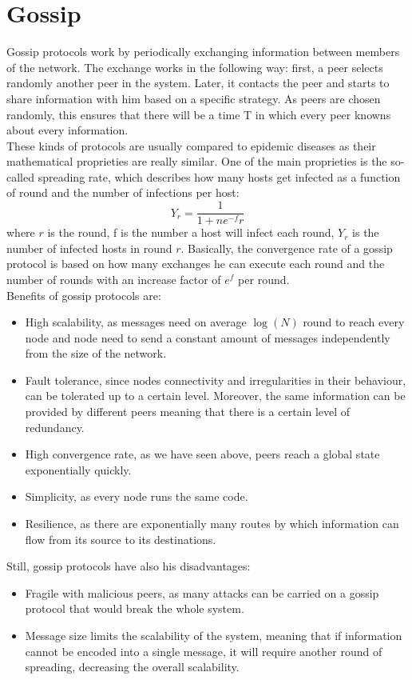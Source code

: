 \documentclass[mscthesis]{usiinfthesis}
\begin{document}
\section{Gossip}
Gossip protocols work by periodically exchanging information between members of the network. The exchange works in the following way: first, a peer selects randomly another peer in the system. Later, it contacts the peer and starts to share information with him based on a specific strategy. As peers are chosen randomly, this ensures that there will be a time T in which every peer knowns about every information. \\
These kinds of protocols are usually compared to epidemic diseases as their mathematical proprieties are really similar. One of the main proprieties is the so-called spreading rate, which describes how many hosts get infected as a function of round and the number of infections per host:
$$Y_r = \frac{1}{1 + ne^{-f}r}$$
where $r$ is the round, f is the number a host will infect each round, $Y_r$ is the number of infected hosts in round $r$. Basically, the convergence rate of a gossip protocol is based on how many exchanges he can execute each round and the number of rounds with an increase factor of $e^f$ per round. \\
Benefits of gossip protocols are:
\begin{itemize}
	\item High scalability, as messages need on average $\log(N)$ round to reach every node and node need to send a constant amount of messages independently from the size of the network.
	\item Fault tolerance, since nodes connectivity and irregularities in their behaviour, can be tolerated up to a certain level. Moreover, the same information can be provided by different peers meaning that there is a certain level of redundancy.
	\item High convergence rate, as we have seen above,  peers reach a global state exponentially quickly.
	\item Simplicity, as every node runs the same code.
	\item Resilience, as there are exponentially many routes by which information can flow from its source to its destinations.
\end{itemize}
\newpage
Still, gossip protocols have also his disadvantages:
\begin{itemize}
	\item Fragile with malicious peers, as many attacks can be carried on a gossip protocol that would break the whole system.
	\item Message size limits the scalability of the system, meaning that if information cannot be encoded into a single message, it will require another round of spreading, decreasing the overall scalability.
\end{itemize}
\end{document}
